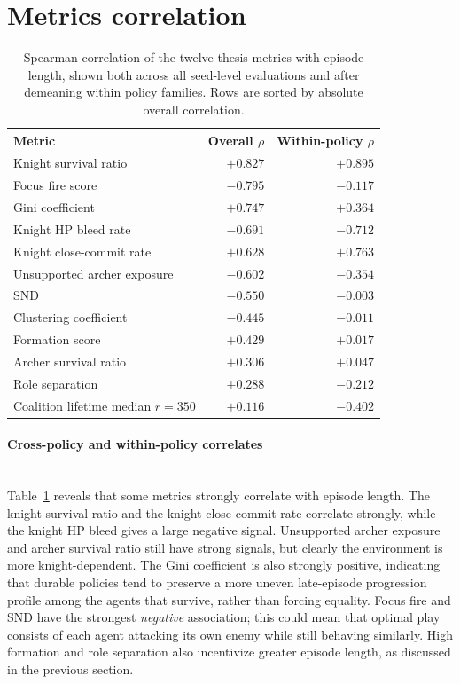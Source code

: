 \section{Metrics correlation}

\begin{table}[H]
    \centering
    \small
    \begin{tabular}{lrr}
        \toprule
        Metric & Overall $\rho$ & Within-policy $\rho$ \\
        \midrule
        Knight survival ratio & $+0.827$ & $+0.895$ \\
        Focus fire score & $-0.795$ & $-0.117$ \\
        Gini coefficient & $+0.747$ & $+0.364$ \\
        Knight HP bleed rate & $-0.691$ & $-0.712$ \\
        Knight close-commit rate & $+0.628$ & $+0.763$ \\
        Unsupported archer exposure & $-0.602$ & $-0.354$ \\
        SND & $-0.550$ & $-0.003$ \\
        Clustering coefficient & $-0.445$ & $-0.011$ \\
        Formation score & $+0.429$ & $+0.017$ \\
        Archer survival ratio & $+0.306$ & $+0.047$ \\
        Role separation & $+0.288$ & $-0.212$ \\
        Coalition lifetime median $r=350$ & $+0.116$ & $-0.402$ \\
        \bottomrule
    \end{tabular}
    \caption[Correlation of metrics with episode length]{Spearman correlation of the twelve thesis metrics with episode length, shown both across all seed-level evaluations and after demeaning within policy families. Rows are sorted by absolute overall correlation.}
    \label{tab:metric-correlation-episode-length}
\end{table}
\paragraph{Cross-policy and within-policy correlates}\mbox{}\\
Table~\ref{tab:metric-correlation-episode-length} reveals that some metrics strongly correlate with episode length. The knight survival ratio and the knight close-commit rate correlate strongly, while the knight HP bleed gives a large negative signal. Unsupported archer exposure and archer survival ratio still have strong signals, but clearly the environment is more knight-dependent. The Gini coefficient is also strongly positive, indicating that durable policies tend to preserve a more uneven late-episode progression profile among the agents that survive, rather than forcing equality. Focus fire and SND have the strongest \emph{negative} association; this could mean that optimal play consists of each agent attacking its own enemy while still behaving similarly. High formation and role separation also incentivize greater episode length, as discussed in the previous section. 

